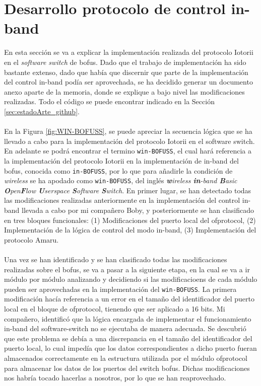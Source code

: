 \section{Desarrollo protocolo de control in-band}
\label{sec:bofussDEV}


En esta sección se va a explicar la implementación realizada del protocolo Iotorii en el \textit{software switch} de \gls{bofus}. Dado que el trabajo de implementación ha sido bastante extenso, dado que había que discernir que parte de la implementación del control in-band podía ser aprovechada, se ha decidido generar un documento anexo \cite{davidBOFUSS} aparte de la memoria, donde se explique a bajo nivel las modificaciones realizadas. Todo el código se puede encontrar indicado en la Sección \ref{sec:estadoArte_github}. \\
\\
En la Figura \ref{fig:WIN-BOFUSS}, se puede apreciar la secuencia lógica que se ha llevado a cabo para la implementación del protocolo Iotorii en el software switch. En adelante se podrá encontrar el termino \texttt{win-BOFUSS}, el cual hará referencia a la implementación del protocolo Iotorii en la implementación de in-band del \gls{bofus}, conocida como \texttt{in-BOFUSS}, por lo que para añadirle la condición de \textit{wireless} se ha apodado como \texttt{win-BOFUSS}, del inglés \textit{\textbf{w}ireless \textbf{in}-band \textbf{B}asic \textbf{O}pen\textbf{F}low \textbf{U}serspace \textbf{S}oftware \textbf{S}witch}. En primer lugar, se han detectado todas las modificaciones realizadas anteriormente en la implementación del control in-band llevada a cabo por mi compañero Boby, y posteriormente se han clasificado en tres bloques funcionales: (1) Modificaciones del puerto local del ofprotocol, (2) Implementación de la  lógica de control del modo in-band, (3) Implementación del protocolo Amaru.\\
\\
Una vez se han identificado y se han clasificado todas las modificaciones realizadas sobre el \gls{bofus}, se va a pasar a la siguiente etapa, en la cual se va a ir módulo por módulo analizando y decidiendo si las modificacioens de cada módulo pueden ser aprovechadas en la implementación del \texttt{win-BOFUSS}. La primera modificación hacía referencia a un error en el tamaño del identificador del puerto local en el bloque de ofprotocol, tienendo que ser aplicado a 16 bits. Mi compañero, identificó que la lógica encargada de implementar el funcionamiento in-band del software-switch no se ejecutaba de manera adecuada. Se descubrió que este problema se debía a una discrepancia en el tamaño del identificador del puerto local, lo cual impedía que los datos correspondientes a dicho puerto fueran almacenados correctamente en la estructura utilizada por el módulo ofprotocol para almacenar los datos de los puertos del switch \gls{bofus}. Dichas modificaciones nos habría tocado hacerlas a nosotros, por lo que se han reaprovechado.\\
